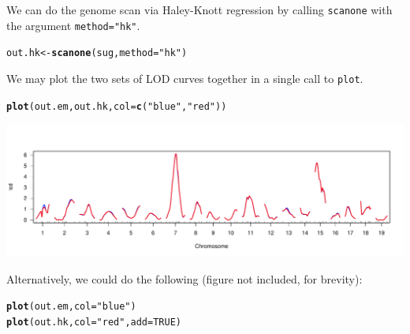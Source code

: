 \documentclass[12pt]{article}\usepackage[]{graphicx}\usepackage[]{color}
\makeatletter
\def\maxwidth{ %
  \ifdim\Gin@nat@width>\linewidth
    \linewidth
  \else
    \Gin@nat@width
  \fi
}
\newcommand{\hlnum}[1]{\textcolor[rgb]{0.686,0.059,0.569}{#1}}%
\newcommand{\hlstr}[1]{\textcolor[rgb]{0.192,0.494,0.8}{#1}}%
\newcommand{\hlstd}[1]{\textcolor[rgb]{0.345,0.345,0.345}{#1}}%
\newcommand{\hlkwb}[1]{\textcolor[rgb]{0.69,0.353,0.396}{#1}}%
\newcommand{\hlkwc}[1]{\textcolor[rgb]{0.333,0.667,0.333}{#1}}%
\newcommand{\hlkwd}[1]{\textcolor[rgb]{0.737,0.353,0.396}{\textbf{#1}}}%
\newenvironment{kframe}{%
 \def\at@end@of@kframe{}%
 \ifinner\ifhmode%
  \def\at@end@of@kframe{\end{minipage}}%
  \begin{minipage}{\columnwidth}%
 \fi\fi%
 \def\FrameCommand##1{\hskip\@totalleftmargin \hskip-\fboxsep
 \colorbox{shadecolor}{##1}\hskip-\fboxsep
     \hskip-\linewidth \hskip-\@totalleftmargin \hskip\columnwidth}%
 \MakeFramed {\advance\hsize-\width
   \@totalleftmargin\z@ \linewidth\hsize
   \@setminipage}}%
 {\par\unskip\endMakeFramed%
 \at@end@of@kframe}
\newenvironment{knitrout}{}{} %
\makeatother
\begin{document}
We can do the genome scan via Haley-Knott regression by calling
{\tt scanone} with the argument {\tt method="hk"}.

\begin{knitrout}
\color{fgcolor}\begin{kframe}
\begin{alltt}
\hlstd{out.hk} \hlkwb{<-} \hlkwd{scanone}\hlstd{(sug,} \hlkwc{method}\hlstd{=}\hlstr{"hk"}\hlstd{)}
\end{alltt}
\end{kframe}
\end{knitrout}

We may plot the two sets of LOD curves together in a single call
to {\tt plot}.

\begin{knitrout}
\color{fgcolor}\begin{kframe}
\begin{alltt}
\hlkwd{plot}\hlstd{(out.em, out.hk,} \hlkwc{col}\hlstd{=}\hlkwd{c}\hlstd{(}\hlstr{"blue"}\hlstd{,} \hlstr{"red"}\hlstd{))}
\end{alltt}
\end{kframe}
\includegraphics[width=\maxwidth]{RnwFigs/plot_em_and_hk-1} 

\end{knitrout}

Alternatively, we could do the following (figure not included, for brevity):

\begin{knitrout}
\color{fgcolor}\begin{kframe}
\begin{alltt}
\hlkwd{plot}\hlstd{(out.em,} \hlkwc{col}\hlstd{=}\hlstr{"blue"}\hlstd{)}
\hlkwd{plot}\hlstd{(out.hk,} \hlkwc{col}\hlstd{=}\hlstr{"red"}\hlstd{,} \hlkwc{add}\hlstd{=}\hlnum{TRUE}\hlstd{)}
\end{alltt}
\end{kframe}
\end{knitrout}
\end{document}
